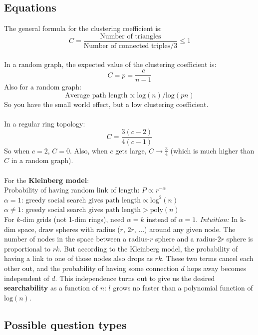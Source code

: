 \documentclass{article}
\begin{document}
\subsection{Equations}

The general formula for the clustering coefficient is:
$$ C = \frac{\text{Number of triangles}}{\text{Number of connected triples}/3} \leq 1 $$ \\
In a random graph, the expected value of the clustering coefficient is:
$$ C = p = \frac{c}{n-1} $$
Also for a random graph:
$$ \text{Average path length} \propto \text{log}(n) / \text{log}(pn) $$
So you have the small world effect, but a low clustering coefficient. \\
\\
In a regular ring topology:
$$ C = \frac{3(c-2)}{4(c-1)} $$
So when $c = 2$, $C = 0$. Also, when $c$ gets large, $C \to \frac{3}{4}$ (which is much higher than $C$ in a random graph). \\
\\
For the \textbf{Kleinberg model}: \\
Probability of having random link of length: $P \propto r^{-\alpha}$ \\
$\alpha = 1$: greedy social search gives $\text{path length} \propto \text{log}^2(n)$ \\
$\alpha \neq 1$: greedy social search gives $\text{path length} > \text{poly}(n)$ \\
For $k$-dim grids (not 1-dim rings), need $\alpha = k$ instead of $\alpha = 1$.
\textit{Intuition:} In k-dim space, draw spheres with radius ($r$, $2r$, ...) around any given node. The number of nodes in the space between a radius-$r$ sphere and a radius-$2r$ sphere is proportional to $rk$. But according to the Kleinberg model, the probability of having a link to one of those nodes also drops as $rk$. These two terms cancel each other out, and the probability of having some connection $d$ hops away becomes independent of $d$. This independence turns out to give us the desired \textbf{searchability} as a function of $n$: $l$ grows no faster than a polynomial function of $\text{log}(n)$.

\subsection{Possible question types}
\end{document}
